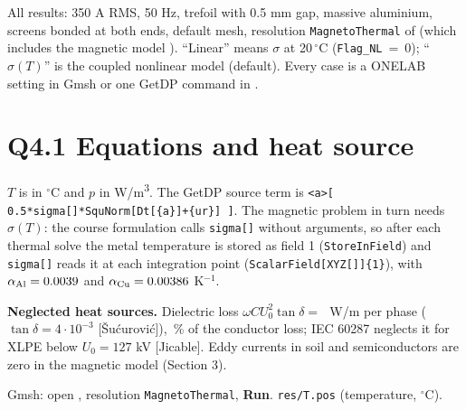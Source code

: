 \def\ReportNumber{4}
\def\ReportName{Coupled magneto-thermal analysis}

\usepackage{pgfplots}\pgfplotsset{compat=1.18}
\graphicspath{{../../Slides/figures/}}


All results: 350 A RMS, 50 Hz, trefoil with 0.5 mm gap, massive aluminium, screens bonded
at both ends, default mesh, resolution \texttt{MagnetoThermal} of \tfile
(which includes the magnetic model \mfile). ``Linear'' means
\(\sigma\) at 20\,\(^\circ\)C (\texttt{Flag\_NL}~=~0); ``\(\sigma(T)\)'' is the coupled nonlinear
model (default). Every case is a ONELAB setting in Gmsh or one GetDP command in \readme.

\section*{Q4.1 Equations and heat source}
\assignmentquestion{\QuestionFourOne}
\answer{\AnsFourOne}
\(T\) is in \(^\circ\)C and \(p\) in W/m\textsuperscript3. The GetDP source term is
\verb|<a>[ 0.5*sigma[]*SquNorm[Dt[{a}]+{ur}] ]|. The magnetic problem in turn needs \(\sigma(T)\): the
course formulation calls \verb|sigma[]| without arguments, so after each thermal solve the metal
temperature is stored as field 1 (\verb|StoreInField|) and \verb|sigma[]| reads it at each integration
point (\verb|ScalarField[XYZ[]]{1}|), with \(\alpha_{\rm Al}=0.0039\) and \(\alpha_{\rm Cu}=0.00386\) K\(^{-1}\).

\begin{center}
\end{center}
\textbf{Neglected heat sources.} Dielectric loss \(\omega C U_0^2\tan\delta=\)\,\AnaWd\ W/m per phase
(\(\tan\delta=4\cdot10^{-3}\) [\v{S}u\'{c}urovi\'{c}]), \AnaWdShare\,\% of the conductor loss; IEC 60287 neglects it for XLPE
below \(U_0=127\) kV [Jicable]. Eddy currents in
soil and semiconductors are zero in the magnetic model (Section 3).

{Gmsh: open \tfile, resolution \texttt{MagnetoThermal}, \textbf{Run}.}
{\texttt{res/T.pos} (temperature, \(^\circ\)C).}

